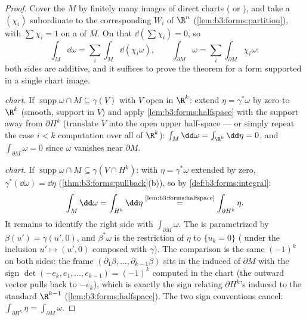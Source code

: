 \begin{proof}
Cover the  $M$ by finitely many images of direct
charts ( or ), and take a 
$(\chi_i)$ subordinate to the corresponding  $W_i$
of $\R^n$ (\cref{lem:b3:forms:partition}), with $\sum\chi_i
= 1$ on a  of $M$. On that 
$\dd(\sum\chi_i) = 0$, so
\[
\int_M\dd\omega = \sum_i\int_M\dd(\chi_i\omega),
\qquad
\int_{\partial M}\omega =
\sum_i\int_{\partial M}\chi_i\omega :
\]
both sides are additive, and it suffices to prove the
theorem for a form supported in a single chart image.

\emph{ chart.} If $\operatorname{supp}\omega \cap M
\subseteq \gamma(V)$ with $V$ open in $\R^k$: extend $\eta =
\gamma^*\omega$ by zero to $\R^k$ (smooth,  support
in $V$) and apply \cref{lem:b3:forms:halfspace} with the
support away from $\partial H^k$ (translate $V$ into the
open upper half-space --- or simply repeat the case $i < k$
computation over all of $\R^k$): $\int_M\dd\omega =
\int_{\R^k}\dd\eta = 0$, and $\int_{\partial M}\omega = 0$
since $\omega$ vanishes near $\partial M$.

\emph{ chart.} If $\operatorname{supp}\omega\cap M
\subseteq \gamma(V \cap H^k)$: with $\eta = \gamma^*\omega$
extended by zero,
$\gamma^*(\dd\omega) = \dd\eta$
(\cref{thm:b3:forms:pullback}(b)), so by
\cref{def:b3:forms:integral}:
\[
\int_M\dd\omega = \int_{H^k}\dd\eta
\overset{\text{\cref{lem:b3:forms:halfspace}}}{=}
\int_{\partial H^k}\eta .
\]
It remains to identify the right side with $\int_{\partial
M}\omega$. The  is parametrized by $\beta(u') =
\gamma(u', 0)$, and $\beta^*\omega$ is the restriction of
$\eta$ to $\{u_k = 0\}$ ( under the inclusion $u'
\mapsto (u', 0)$ composed with $\gamma$). The 
comparison is the same $(-1)^k$ on both sides: the frame
$(\partial_1\beta, \dots, \partial_{k-1}\beta)$ sits in the
induced  of $\partial M$ with the sign
$\det(-e_k, e_1, \dots, e_{k-1}) = (-1)^k$ computed in the
chart (the outward vector pulls back to $-e_k$), which is
exactly the sign relating $\partial H^k$'s induced
 to the standard $\R^{k-1}$
(\cref{lem:b3:forms:halfspace}). The two sign conventions
cancel:
$\int_{\partial H^k}\eta = \int_{\partial M}\omega$.
\end{proof}

